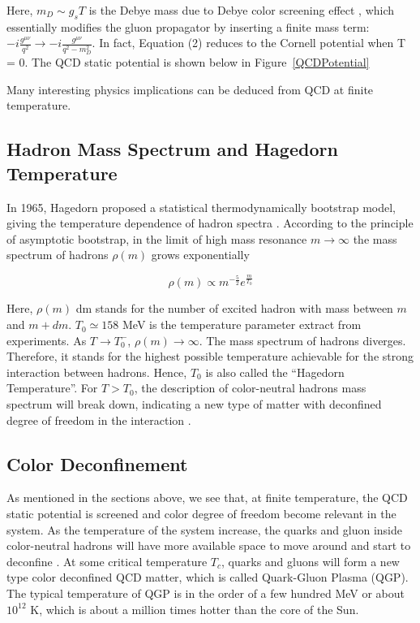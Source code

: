 Here, $m_D \sim g_s T$ is the Debye mass due to Debye color screening effect \cite{CSEff}, which essentially modifies the gluon propagator by inserting a finite mass term: $-i \frac{g^{\mu\nu}}{q^2} \rightarrow -i \frac{g^{\mu\nu}}{q^2 - m_D^2}$. In fact, Equation (2) reduces to the Cornell potential when T = 0. The QCD static potential is shown below in Figure~\ref{QCDPotential}


Many interesting physics implications can be deduced from QCD at finite temperature.


\subsection{Hadron Mass Spectrum and Hagedorn Temperature}

In 1965, Hagedorn proposed a statistical thermodynamically bootstrap model, giving the temperature dependence of hadron spectra \cite{Hagedorn}. According to the principle of asymptotic bootstrap, in the limit of high mass resonance $m \rightarrow \infty$ the mass spectrum of hadrons $\rho(m)$ grows exponentially 

\begin{equation}
\rho (m) \propto m^{-\frac{5}{2}} e^{\frac{m}{T_0}}
\end{equation}

Here, $\rho(m)$ dm stands for the number of excited hadron with mass between $m$ and $m+dm$. $T_0 \simeq 158$ MeV is the temperature parameter extract from experiments. As $T \rightarrow T_0^-$, $\rho(m) \rightarrow \infty$. The mass spectrum of hadrons diverges. Therefore, it stands for the highest possible temperature achievable for the strong interaction between hadrons. Hence, $T_0$ is also called the ``Hagedorn Temperature''. For $ T > T_0$, the description of color-neutral hadrons mass spectrum will break down, indicating a new type of matter with deconfined degree of freedom in the interaction \cite{HagedornDeconfine}.

\subsection{Color Deconfinement}

As mentioned in the sections above, we see that, at finite temperature, the QCD static potential is screened and color degree of freedom become relevant in the system. As the temperature of the system increase, the quarks and gluon inside color-neutral hadrons will have more available space to move around and start to deconfine \cite{DeconfineTemp}. At some critical temperature $T_c$, quarks and gluons will form a new type color deconfined QCD matter, which is called Quark-Gluon Plasma (QGP). The typical temperature of QGP is in the order of a few hundred MeV or about $10^{12}$ K, which is about a million times hotter than the core of the Sun.

